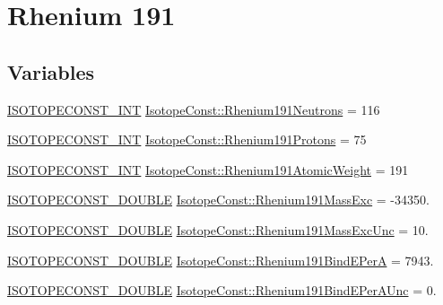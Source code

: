 \hypertarget{group___isotope_const-_rhenium-_re191}{}\section{Rhenium 191}
\label{group___isotope_const-_rhenium-_re191}
\subsection*{Variables}
\begin{DoxyCompactItemize}
\item 
\mbox{\hyperlink{group___isotope_const-_macros_ga5f18360b3e99483a35c32d789e62621c}{I\+S\+O\+T\+O\+P\+E\+C\+O\+N\+S\+T\+\_\+\+I\+NT}} \mbox{\hyperlink{group___isotope_const-_rhenium-_re191_gae3202aeb40deb4e49df34d4b410896f3}{Isotope\+Const\+::\+Rhenium191\+Neutrons}} = 116
\item 
\mbox{\hyperlink{group___isotope_const-_macros_ga5f18360b3e99483a35c32d789e62621c}{I\+S\+O\+T\+O\+P\+E\+C\+O\+N\+S\+T\+\_\+\+I\+NT}} \mbox{\hyperlink{group___isotope_const-_rhenium-_re191_gafa442f2777932b806c14149988ae4872}{Isotope\+Const\+::\+Rhenium191\+Protons}} = 75
\item 
\mbox{\hyperlink{group___isotope_const-_macros_ga5f18360b3e99483a35c32d789e62621c}{I\+S\+O\+T\+O\+P\+E\+C\+O\+N\+S\+T\+\_\+\+I\+NT}} \mbox{\hyperlink{group___isotope_const-_rhenium-_re191_gadbea80cafe1ae14f50cf8188a56c7e01}{Isotope\+Const\+::\+Rhenium191\+Atomic\+Weight}} = 191
\item 
\mbox{\hyperlink{group___isotope_const-_macros_ga8f45a7272ce02c0b4c65c44636ed719a}{I\+S\+O\+T\+O\+P\+E\+C\+O\+N\+S\+T\+\_\+\+D\+O\+U\+B\+LE}} \mbox{\hyperlink{group___isotope_const-_rhenium-_re191_ga464ba770c68141f3f85f8629aa4b84ef}{Isotope\+Const\+::\+Rhenium191\+Mass\+Exc}} = -\/34350.
\item 
\mbox{\hyperlink{group___isotope_const-_macros_ga8f45a7272ce02c0b4c65c44636ed719a}{I\+S\+O\+T\+O\+P\+E\+C\+O\+N\+S\+T\+\_\+\+D\+O\+U\+B\+LE}} \mbox{\hyperlink{group___isotope_const-_rhenium-_re191_gaa02f557d9f30b53cd40fe7a7a6b68f02}{Isotope\+Const\+::\+Rhenium191\+Mass\+Exc\+Unc}} = 10.
\item 
\mbox{\hyperlink{group___isotope_const-_macros_ga8f45a7272ce02c0b4c65c44636ed719a}{I\+S\+O\+T\+O\+P\+E\+C\+O\+N\+S\+T\+\_\+\+D\+O\+U\+B\+LE}} \mbox{\hyperlink{group___isotope_const-_rhenium-_re191_gaa7b9e7ad00a43a5670efbf7b83c4598b}{Isotope\+Const\+::\+Rhenium191\+Bind\+E\+PerA}} = 7943.
\item 
\mbox{\hyperlink{group___isotope_const-_macros_ga8f45a7272ce02c0b4c65c44636ed719a}{I\+S\+O\+T\+O\+P\+E\+C\+O\+N\+S\+T\+\_\+\+D\+O\+U\+B\+LE}} \mbox{\hyperlink{group___isotope_const-_rhenium-_re191_ga5ec376a76f3810242cb30bf042304de0}{Isotope\+Const\+::\+Rhenium191\+Bind\+E\+Per\+A\+Unc}} = 0.

\end{DoxyCompactItemize}
